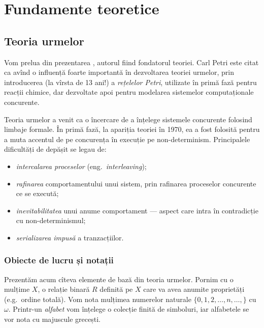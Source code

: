 
\chapter{Fundamente teoretice}

\section{Teoria urmelor}

Vom prelua din prezentarea \cite{mazu}, autorul fiind fondatorul teoriei.
Carl Petri este citat ca avînd o influență foarte importantă în dezvoltarea
teoriei urmelor, prin introducerea (la vîrsta de 13 ani!) a
\emph{rețelelor Petri}, utilizate în primă fază pentru reacții chimice,
dar dezvoltate apoi pentru modelarea sistemelor computaționale concurente.

Teoria urmelor a venit ca o încercare de a înțelege sistemele concurente
folosind limbaje formale. În primă fază, la apariția teoriei în 1970, ea a
fost folosită pentru a muta accentul de pe concurența în execuție pe
non-determinism. Principalele dificultăți de depășit se legau de:
\begin{itemize}
    \item \emph{intercalarea proceselor} (eng.\ \emph{interleaving});
    \item \emph{rafinarea} comportamentului unui sistem, prin rafinarea
        proceselor concurente ce se execută;
    \item \emph{inevitabilitatea} unui anume comportament --- aspect
        care intra în contradicție cu non-determinismul;
    \item \emph{serializarea impusă} a tranzacțiilor.
\end{itemize}

\subsection{Obiecte de lucru și notații}

Prezentăm acum cîteva elemente de bază din teoria urmelor. Pornim cu
o mulțime $ X $, o relație binară $ R $ definită pe $ X $ care va avea
anumite proprietăți (e.g.\ ordine totală). Vom nota mulțimea numerelor
naturale $ \{ 0, 1, 2, \dots, n, \dots, \} $ cu $ \omega $. Printr-un
\emph{alfabet} vom înțelege o colecție finită de simboluri, iar
alfabetele se vor nota cu majuscule grecești.

